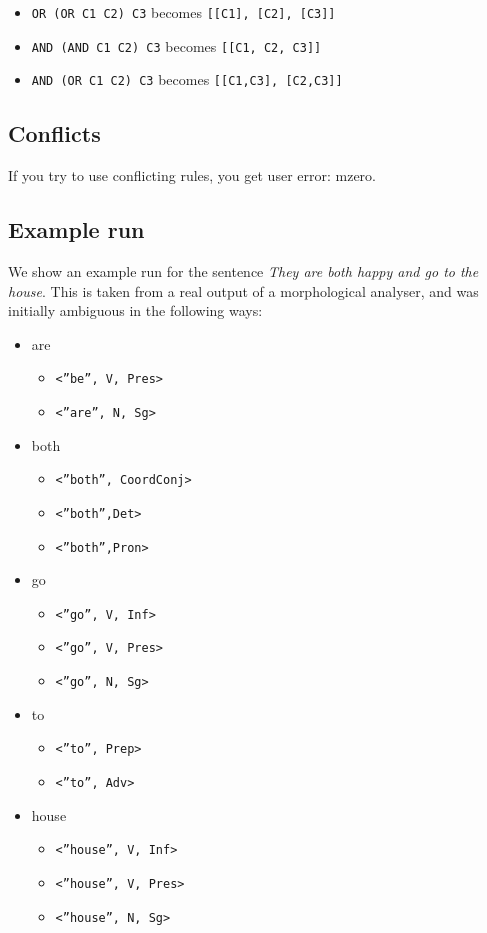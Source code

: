 \documentclass[a4paper, 11pt]{article}
\begin{document}
\begin{itemize}
\item \texttt{OR (OR C1 C2) C3} becomes \texttt{[[C1], [C2], [C3]]} 
\item \texttt{AND (AND C1 C2) C3} becomes \texttt{[[C1, C2, C3]]} 
\item \texttt{AND (OR C1 C2) C3} becomes \texttt{[[C1,C3], [C2,C3]]}
\end{itemize}

\subsection{Conflicts}
If you try to use conflicting rules, you get user error: mzero.

\subsection{Example run}

We show an example run for the sentence \emph{They are both happy and go to the house}. This is
taken from a real output of a morphological analyser, and was
initially ambiguous in the following ways:

\begin{itemize}
\item[] are
\begin{itemize}
\item[] \texttt{<''be'', V, Pres>}
\item[] \texttt{<''are'', N, Sg>}
\end{itemize}

\item[] both
\begin{itemize}
\item[] \texttt{<''both'', CoordConj>}
\item[] \texttt{<''both'',Det>}
\item[] \texttt{<''both'',Pron>}
\end{itemize}


\item[] go
\begin{itemize}
\item[] \texttt{<''go'', V, Inf>}
\item[] \texttt{<''go'', V, Pres>}
\item[] \texttt{<''go'', N, Sg>}
\end{itemize}

\item[] to
\begin{itemize}
\item[] \texttt{<''to'', Prep>}
\item[] \texttt{<''to'', Adv>}
\end{itemize}

\item[] house
\begin{itemize}
\item[] \texttt{<''house'', V, Inf>}
\item[] \texttt{<''house'', V, Pres>}
\item[] \texttt{<''house'', N, Sg>}
\end{itemize}
\end{itemize}
\end{document}
